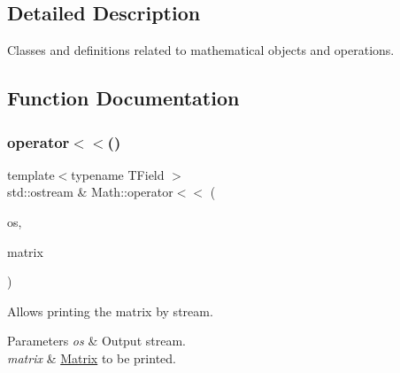 \subsection{Detailed Description}
Classes and definitions related to mathematical objects and operations. 

\subsection{Function Documentation}
\mbox{\label{namespaceMath_a03def80e3e35c7171610f7af0390032f}} 
\subsubsection{\texorpdfstring{operator$<$$<$()}{operator<<()}}
{\footnotesize\ttfamily template$<$typename T\+Field $>$ \\
std\+::ostream \& Math\+::operator$<$$<$ (\begin{DoxyParamCaption}\item[{std\+::ostream \&}]{os,  }\item[{const \mbox{\hyperlink{classMath_1_1Matrix}{Math\+::\+Matrix}}$<$ T\+Field $>$ \&}]{matrix }\end{DoxyParamCaption})}



Allows printing the matrix by stream. 


\begin{DoxyParams}{Parameters}
{\em os} & Output stream. \\
\hline
{\em matrix} & \mbox{\hyperlink{classMath_1_1Matrix}{Matrix}} to be printed. \\
\hline
\end{DoxyParams}
